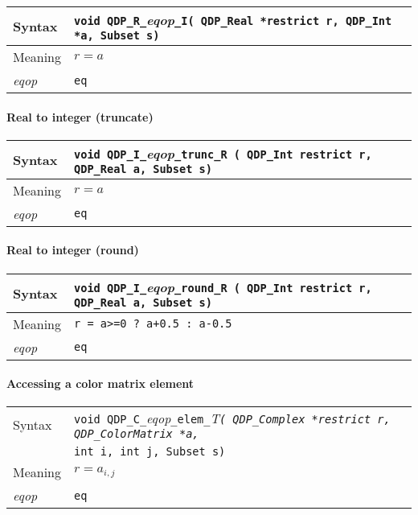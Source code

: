 \documentclass{article}
\newcommand{\tReal}{QDP\ttdash Real }
\newcommand{\tComplex}{QDP\ttdash Complex }
\newcommand{\tInt}{QDP\ttdash Int }
\newcommand{\tColorMatrix}{QDP\ttdash ColorMatrix }
\newcommand{\namespace}{QDP}
\newcommand{\ttdash}{{\tt \_}}
\newcommand{\itt}{\it T}
\newcommand{\extraarg}{, Subset s}
\newcommand{\protoUnarySingleTypesRI}{{\tt void \namespace}\ttdash{\tt R}\ttdash{\it eqop}\ttdash{\tt I}{\tt ( \tReal *restrict r, \tInt *a\extraarg)}}
\begin{document}
\begin{flushleft}
  \begin{tabular}{|l|l|}
  \hline
  Syntax      & \protoUnarySingleTypesRI \\
  \hline
  Meaning     & $r = a$ \\
  \hline
  {\it eqop}  & {\tt eq} \\
  \hline
  \end{tabular}
\end{flushleft}

\paragraph{Real to integer (truncate)}

\begin{flushleft}
  \begin{tabular}{|l|l|}
  \hline
  Syntax      & {\tt void \namespace}\ttdash{\tt I}\ttdash{\it eqop}\ttdash{\tt trunc}\ttdash{\tt R ( \tInt }{\tt *restrict r, \tReal }{\tt *a\extraarg)}\\
  \hline
  Meaning     & $r = a$ \\
  \hline
  {\it eqop}  & {\tt eq} \\
  \hline
  \end{tabular}
\end{flushleft}

\paragraph{Real to integer (round)}

\begin{flushleft}
  \begin{tabular}{|l|l|}
  \hline
  Syntax      & {\tt void \namespace}\ttdash{\tt I}\ttdash{\it eqop}\ttdash{\tt round}\ttdash{\tt R ( \tInt }{\tt *restrict r, \tReal }{\tt *a\extraarg)}\\
  \hline
  Meaning     & {\tt r = a>=0 ? a+0.5 : a-0.5} \\
  \hline
  {\it eqop}  & {\tt eq} \\
  \hline
  \end{tabular}
\end{flushleft}

\paragraph{Accessing a color matrix element}

\begin{flushleft}
  \begin{tabular}{|l|l|}
  \hline
  Syntax      & {\tt void \namespace}\ttdash{\tt C}\ttdash{\it eqop}\ttdash{\tt elem}\ttdash\itt{\tt ( \tComplex *restrict r, \tColorMatrix *a,}\\
              & {\tt int i, int j\extraarg)} \\
  \hline
  Meaning     & $r = a_{i,j}$\\
  \hline
  {\it eqop}  & {\tt eq} \\
  \hline
  \end{tabular}
\end{flushleft}
\end{document}
